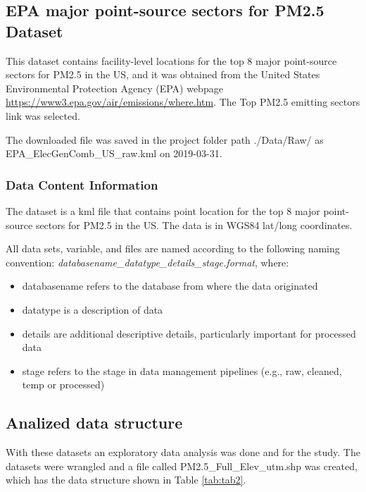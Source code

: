 \documentclass[12pt,]{article}
\begin{document}
\subsection{EPA major point-source sectors for PM2.5
Dataset}\label{epa-major-point-source-sectors-for-pm2.5-dataset}

This dataset contains facility-level locations for the top 8 major
point-source sectors for PM2.5 in the US, and it was obtained from the
United States Environmental Protection Agency (EPA) webpage
\url{https://www3.epa.gov/air/emissions/where.htm}. The Top PM2.5
emitting sectors link was selected.

The downloaded file was saved in the project folder path ./Data/Raw/ as
EPA\_ElecGenComb\_US\_raw.kml on 2019-03-31.

\subsubsection{Data Content
Information}\label{data-content-information-4}

The dataset is a kml file that contains point location for the top 8
major point-source sectors for PM2.5 in the US. The data is in WGS84
lat/long coordinates.

All data sets, variable, and files are named according to the following
naming convention: \emph{databasename\_datatype\_details\_stage.format},
where:

\begin{itemize}
\item
  databasename refers to the database from where the data originated
\item
  datatype is a description of data
\item
  details are additional descriptive details, particularly important for
  processed data
\item
  stage refers to the stage in data management pipelines (e.g., raw,
  cleaned, temp or processed)
\end{itemize}

\subsection{Analized data structure}\label{analized-data-structure}

With these datasets an exploratory data analysis was done and for the
study. The datasets were wrangled and a file called
PM2.5\_Full\_Elev\_utm.shp was created, which has the data structure
shown in Table \ref{tab:tab2}.
\end{document}
